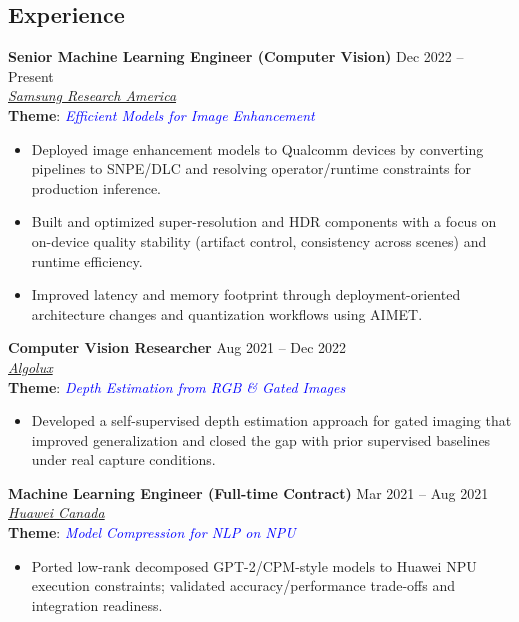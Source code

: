 \documentclass[margin, centered]{res}
\begin{document}
\begin{resume}
\section{Experience}

\textbf{Senior Machine Learning Engineer (Computer Vision)} \hfill Dec 2022 -- Present\\
\href{https://www.sra.samsung.com/}{\textit{Samsung Research America}}\\
\textbf{Theme}: \textcolor{blue}{\emph{Efficient Models for Image Enhancement}}
\vspace{1mm}
\begin{itemize}[leftmargin=*]
    \item Deployed image enhancement models to Qualcomm devices by converting pipelines to SNPE/DLC and resolving operator/runtime constraints for production inference.
    \item Built and optimized super-resolution and HDR components with a focus on on-device quality stability (artifact control, consistency across scenes) and runtime efficiency.
    \item Improved latency and memory footprint through deployment-oriented architecture changes and quantization workflows using AIMET.
\end{itemize}

\textbf{Computer Vision Researcher} \hfill Aug 2021 -- Dec 2022\\
\href{https://www.algolux.com/}{\textit{Algolux}}\\
\textbf{Theme}: \textcolor{blue}{\emph{Depth Estimation from RGB \& Gated Images}}
\vspace{1mm}
\begin{itemize}[leftmargin=*]
    \item Developed a self-supervised depth estimation approach for gated imaging that improved generalization and closed the gap with prior supervised baselines under real capture conditions.
\end{itemize}

\textbf{Machine Learning Engineer (Full-time Contract)} \hfill Mar 2021 -- Aug 2021\\
\href{https://www.huawei.com/ca/}{\textit{Huawei Canada}}\\
\textbf{Theme}: \textcolor{blue}{\emph{Model Compression for NLP on NPU}}
\vspace{1mm}
\begin{itemize}[leftmargin=*]
    \item Ported low-rank decomposed GPT-2/CPM-style models to Huawei NPU execution constraints; validated accuracy/performance trade-offs and integration readiness.
\end{itemize}



\end{resume}
\end{document}
